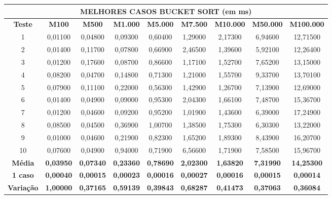 \documentclass[a4paper, 12pt]{article}
\begin{document}
\begin{tabular}{ccccccccc}

                                                    \multicolumn{ 9}{c}{{\bf MELHORES CASOS  BUCKET SORT (em ms)}} \\
\hline
{\bf Teste} & {\bf M100} & {\bf M500} & {\bf M1.000} & {\bf M5.000} & {\bf M7.500} & {\bf M10.000} & {\bf M50.000} & {\bf M100.000} \\
\hline
         1 &    0,01100 &    0,04800 &    0,09300 &    0,60400 &    1,29000 &    2,17300 &    6,94600 &   12,71500 \\
\hline
         2 &    0,01400 &    0,11700 &    0,07800 &    0,66900 &    2,46500 &    1,39600 &    5,92100 &   12,26400 \\
\hline
         3 &    0,01200 &    0,17600 &    0,08700 &    0,86600 &    1,17100 &    1,52700 &    7,65200 &   13,15000 \\
\hline
         4 &    0,08200 &    0,04700 &    0,14800 &    0,71300 &    1,21000 &    1,55700 &    9,33700 &   13,70100 \\
\hline
         5 &    0,07900 &    0,11100 &    0,22000 &    0,56300 &    1,42900 &    1,26700 &    7,13900 &   12,69000 \\
\hline
         6 &    0,01400 &    0,04900 &    0,09000 &    0,95300 &    2,04300 &    1,66100 &    7,48700 &   15,36700 \\
\hline
         7 &    0,01200 &    0,04600 &    0,09200 &    0,95200 &    1,01900 &    1,43600 &    6,39000 &   17,24900 \\
\hline
         8 &    0,08500 &    0,04500 &    0,36900 &    1,00700 &    1,38500 &    1,75300 &    6,30300 &   13,22000 \\
\hline
         9 &    0,01000 &    0,04600 &    0,21900 &    0,82300 &    1,65200 &    1,89300 &    8,43900 &   16,20700 \\
\hline
        10 &    0,07600 &    0,04900 &    0,94000 &    0,71900 &    6,56600 &    1,71900 &    7,58500 &   15,96700 \\
\hline
{\bf Média} & {\bf 0,03950} & {\bf 0,07340} & {\bf 0,23360} & {\bf 0,78690} & {\bf 2,02300} & {\bf 1,63820} & {\bf 7,31990} & {\bf 14,25300} \\
\hline
{\bf 1 caso} & {\bf 0,00040} & {\bf 0,00015} & {\bf 0,00023} & {\bf 0,00016} & {\bf 0,00027} & {\bf 0,00016} & {\bf 0,00015} & {\bf 0,00014} \\
\hline
{\bf Variação} & {\bf 1,00000} & {\bf 0,37165} & {\bf 0,59139} & {\bf 0,39843} & {\bf 0,68287} & {\bf 0,41473} & {\bf 0,37063} & {\bf 0,36084} \\
\hline
\end{tabular}  
\vspace{0.3cm}
\end{document}
